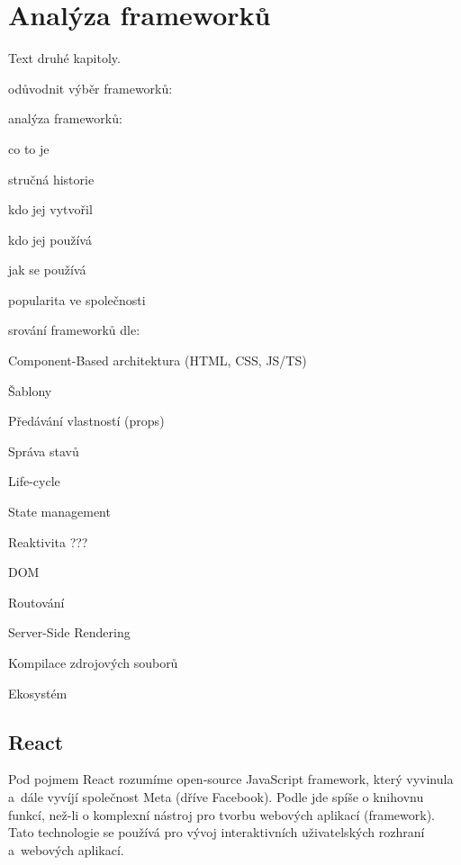 \section{Analýza frameworků}

Text druhé kapitoly.

\begin{citemize}
	\item odůvodnit výběr frameworků:
	\begin{citemize}
		\item {}
	\end{citemize}

	\item analýza frameworků:
	\begin{citemize}
		\item co to je
		\item stručná historie
		\item kdo jej vytvořil
		\item kdo jej používá
		\item jak se používá
		\item popularita ve společnosti
	\end{citemize}

	\item srování frameworků dle:
	\begin{cenumerate}
		\item Component-Based architektura (HTML, CSS, JS/TS)
		\item Šablony
		\item Předávání vlastností (props)
		\item Správa stavů
		\item Life-cycle
		\item State management
		\item Reaktivita ???
		\item DOM
		\item Routování
		\item Server-Side Rendering
		\item Kompilace zdrojových souborů
		\item Ekosystém
	\end{cenumerate}
\end{citemize}


\subsection{React}

Pod pojmem React rozumíme open-source JavaScript framework, který vyvinula a~dále vyvíjí společnost Meta (dříve Facebook). 
Podle \cite{reactbanks} jde spíše o knihovnu funkcí, než-li o komplexní nástroj pro tvorbu webových aplikací (framework). 
Tato technologie se používá pro vývoj interaktivních uživatelských rozhraní a~webových aplikací.\cite{reacthubspot}

